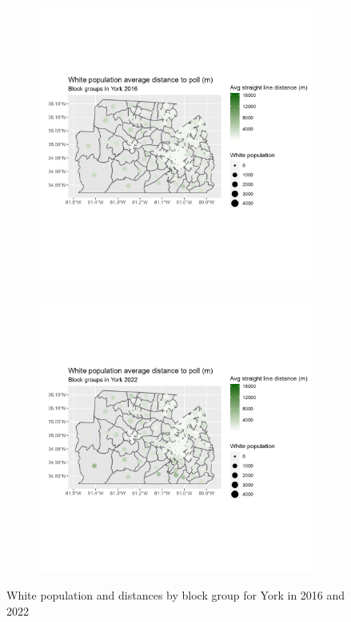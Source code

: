 \documentclass[11pt]{article}
\theoremstyle{remark}
\theoremstyle{definition}
\begin{document}
\begin{figure}
	\begin{subfigure}{.5\textwidth}
		\centering
		\includegraphics[width=\linewidth]{result_analysis/York_County_SC_original_configs/white_pop_and_dist_York_config_original_2016_polls.png}
		\label{sfig:York_2016_bg_dist_pop}
	\end{subfigure} 
	\begin{subfigure}{.5\textwidth}
		\centering
		\includegraphics[width=\linewidth]{result_analysis/York_County_SC_original_configs/white_pop_and_dist_York_config_original_2022_polls.png}
		\label{sfig:York_2022_bg_dist}
	\end{subfigure}
	\caption{White population and distances by block group for York in 2016 and 2022}
	\label{fig:York distance White population maps}
\end{figure}
\end{document}
